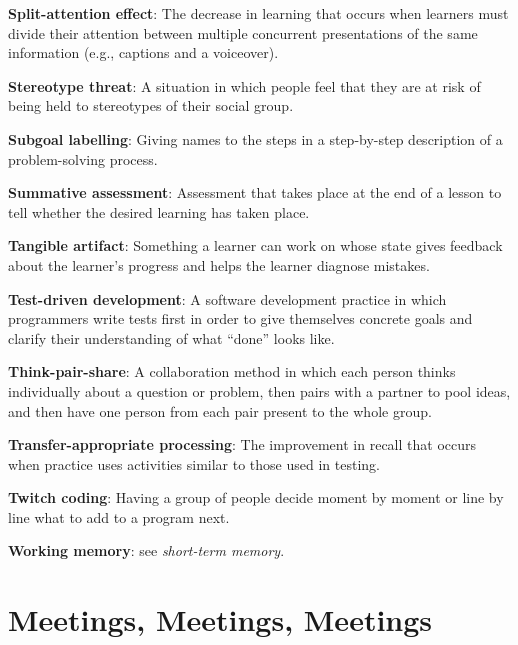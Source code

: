 \textbf{\hypertarget{g:split-attention-effect}{Split-attention effect}\label{g:split-attention-effect}}: The
decrease in learning that occurs when learners must divide their
attention between multiple concurrent presentations of the same
information (e.g., captions and a voiceover).

\textbf{\hypertarget{g:stereotype-threat}{Stereotype threat}\label{g:stereotype-threat}}: A situation in
which people feel that they are at risk of being held to stereotypes of
their social group.

\textbf{\hypertarget{g:subgoal-labelling}{Subgoal labelling}\label{g:subgoal-labelling}}: Giving names to the
steps in a step-by-step description of a problem-solving process.

\textbf{\hypertarget{g:summative-assessment}{Summative assessment}\label{g:summative-assessment}}: Assessment
that takes place at the end of a lesson to tell whether the desired
learning has taken place.

\textbf{\hypertarget{g:tangible-artifact}{Tangible artifact}\label{g:tangible-artifact}}: Something a learner
can work on whose state gives feedback about the learner's progress and
helps the learner diagnose mistakes.

\textbf{\hypertarget{g:test-driven-development}{Test-driven development}\label{g:test-driven-development}}: A
software development practice in which programmers write tests first in
order to give themselves concrete goals and clarify their understanding
of what ``done'' looks like.

\textbf{\hypertarget{g:think-pair-share}{Think-pair-share}\label{g:think-pair-share}}: A collaboration
method in which each person thinks individually about a question or
problem, then pairs with a partner to pool ideas, and then have one
person from each pair present to the whole group.

\textbf{\hypertarget{g:transfer-appropriate-processing}{Transfer-appropriate processing}\label{g:transfer-appropriate-processing}}:
The improvement in recall that occurs when practice uses activities
similar to those used in testing.

\textbf{\hypertarget{g:twitch-coding}{Twitch coding}\label{g:twitch-coding}}: Having a group of people
decide moment by moment or line by line what to add to a program next.

\textbf{\hypertarget{g:working-memory}{Working memory}\label{g:working-memory}}: see \emph{short-term memory}.

\chapter{Meetings, Meetings, Meetings}\label{s:meetings}


